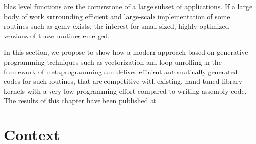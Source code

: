 \documentclass[../main]{subfiles}
\begin{document}

\gls{blas} level functions are the cornerstone of a large
subset of applications. If a large body of work surrounding
efficient and large-scale implementation of some routines such
as gemv exists, the interest for small-sized, highly-optimized
versions of those routines emerged.

In this section, we propose
to show how a modern \cpp approach based on generative
programming techniques such as vectorization and loop unrolling
in the framework of metaprogramming can deliver
efficient automatically generated codes for such routines, that
are competitive with existing, hand-tuned library kernels with
a very low programming effort compared to writing assembly
code.
\\

The results of this chapter have been published at %
\\

\section{
  Context
}
\end{document}
